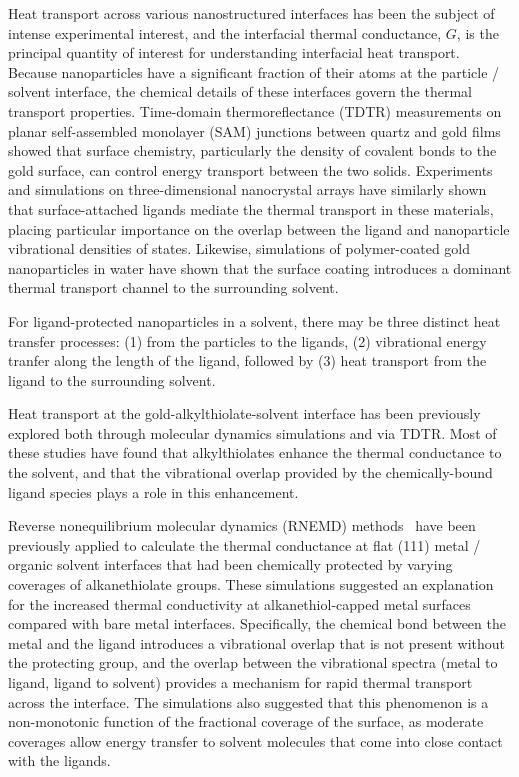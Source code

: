 \documentclass[aps,jcp,preprint,showpacs,superscriptaddress,groupedaddress]{revtex4-1}  %
\begin{document}
Heat transport across various nanostructured interfaces has been the
subject of intense experimental
interest,\cite{Wilson:2002uq,Ge:2004yg,Shenogina:2009ix,Wang10082007,Schmidt:2008ad,Juve:2009pt,Alper:2010pd,Harikrishna:2013ys}
and the interfacial thermal conductance, $G$, is the principal
quantity of interest for understanding interfacial heat
transport.\cite{Cahill:2003fk} Because nanoparticles have a
significant fraction of their atoms at the particle / solvent
interface, the chemical details of these interfaces govern the thermal
transport properties.  Time-domain thermoreflectance (TDTR)
measurements on planar self-assembled monolayer (SAM) junctions
between quartz and gold films showed that surface chemistry,
particularly the density of covalent bonds to the gold surface, can
control energy transport between the two solids.\cite{Losego:2012fr}
Experiments and simulations on three-dimensional nanocrystal arrays
have similarly shown that surface-attached ligands mediate the thermal
transport in these materials, placing particular importance on the
overlap between the ligand and nanoparticle vibrational densities of
states.\cite{Ong:2013rt,Ong:2014yq} Likewise, simulations of
polymer-coated gold nanoparticles in water have shown that the surface
coating introduces a dominant thermal transport channel to the
surrounding solvent.\cite{Soussi:2015fj}

For ligand-protected nanoparticles in a solvent, there may be three
distinct heat transfer processes: (1) from the particles to the
ligands, (2) vibrational energy tranfer along the length of the
ligand, followed by (3) heat transport from the ligand to the
surrounding solvent.\cite{Ge:2006kx}

Heat transport at the gold-alkylthiolate-solvent interface has been
previously explored both through molecular dynamics simulations and
via
TDTR.\cite{Kikugawa:2009vn,Kuang:2011ef,Stocker:2013cl,Tian:2015uq}
Most of these studies have found that alkylthiolates enhance the
thermal conductance to the solvent, and that the vibrational overlap
provided by the chemically-bound ligand species plays a role in this
enhancement.

Reverse nonequilibrium molecular dynamics (RNEMD)
methods~\cite{Muller-Plathe:1997wq} have been previously applied to
calculate the thermal conductance at flat (111) metal / organic
solvent interfaces that had been chemically protected by varying
coverages of alkanethiolate groups.\cite{Kuang:2011ef} These
simulations suggested an explanation for the increased thermal
conductivity at alkanethiol-capped metal surfaces compared with bare
metal interfaces.  Specifically, the chemical bond between the metal
and the ligand introduces a vibrational overlap that is not present
without the protecting group, and the overlap between the vibrational
spectra (metal to ligand, ligand to solvent) provides a mechanism for
rapid thermal transport across the interface. The simulations also
suggested that this phenomenon is a non-monotonic function of the
fractional coverage of the surface, as moderate coverages allow energy
transfer to solvent molecules that come into close contact with the
ligands.
\end{document}
